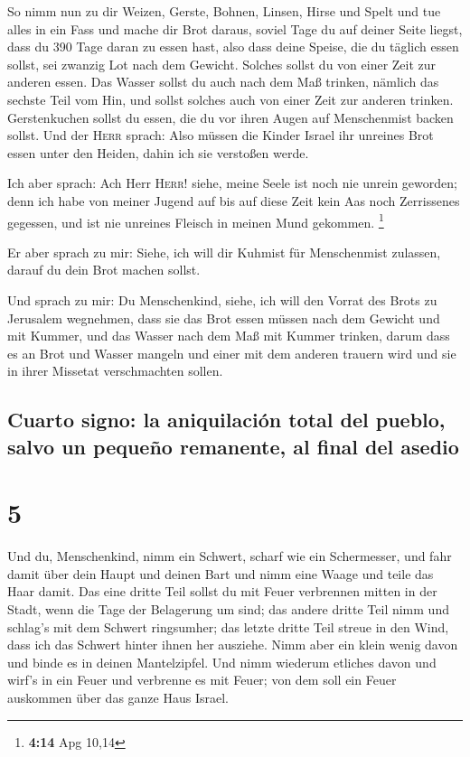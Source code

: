  So nimm nun zu dir Weizen, Gerste, Bohnen, Linsen, Hirse
und Spelt und tue alles in ein Fass und mache dir Brot daraus, soviel
Tage du auf deiner Seite liegst, dass du 390 Tage daran zu essen hast,
 also dass deine Speise, die du täglich essen sollst, sei
zwanzig Lot nach dem Gewicht. Solches sollst du von einer Zeit zur
anderen essen.  Das Wasser sollst du auch nach dem Maß
trinken, nämlich das sechste Teil vom Hin, und sollst solches auch von
einer Zeit zur anderen trinken.  Gerstenkuchen sollst du
essen, die du vor ihren Augen auf Menschenmist backen sollst.
 Und der \textsc{Herr} sprach: Also müssen die Kinder
Israel ihr unreines Brot essen unter den Heiden, dahin ich sie verstoßen
werde.

 Ich aber sprach: Ach Herr \textsc{Herr}! siehe, meine
Seele ist noch nie unrein geworden; denn ich habe von meiner Jugend auf
bis auf diese Zeit kein Aas noch Zerrissenes gegessen, und ist nie
unreines Fleisch in meinen Mund gekommen. \footnote{\textbf{4:14} Apg
  10,14}

 Er aber sprach zu mir: Siehe, ich will dir Kuhmist für
Menschenmist zulassen, darauf du dein Brot machen sollst.

 Und sprach zu mir: Du Menschenkind, siehe, ich will den
Vorrat des Brots zu Jerusalem wegnehmen, dass sie das Brot essen müssen
nach dem Gewicht und mit Kummer, und das Wasser nach dem Maß mit Kummer
trinken,  darum dass es an Brot und Wasser mangeln und
einer mit dem anderen trauern wird und sie in ihrer Missetat
verschmachten sollen.

\hypertarget{cuarto-signo-la-aniquilaciuxf3n-total-del-pueblo-salvo-un-pequeuxf1o-remanente-al-final-del-asedio}{%
\subsection{Cuarto signo: la aniquilación total del pueblo, salvo un
pequeño remanente, al final del
asedio}\label{cuarto-signo-la-aniquilaciuxf3n-total-del-pueblo-salvo-un-pequeuxf1o-remanente-al-final-del-asedio}}

\hypertarget{section-4}{%
\section{5}\label{section-4}}

 Und du, Menschenkind, nimm ein Schwert, scharf wie ein
Schermesser, und fahr damit über dein Haupt und deinen Bart und nimm
eine Waage und teile das Haar damit.  Das eine dritte Teil
sollst du mit Feuer verbrennen mitten in der Stadt, wenn die Tage der
Belagerung um sind; das andere dritte Teil nimm und schlag's mit dem
Schwert ringsumher; das letzte dritte Teil streue in den Wind, dass ich
das Schwert hinter ihnen her ausziehe.  Nimm aber ein
klein wenig davon und binde es in deinen Mantelzipfel. 
Und nimm wiederum etliches davon und wirf's in ein Feuer und verbrenne
es mit Feuer; von dem soll ein Feuer auskommen über das ganze Haus
Israel.

